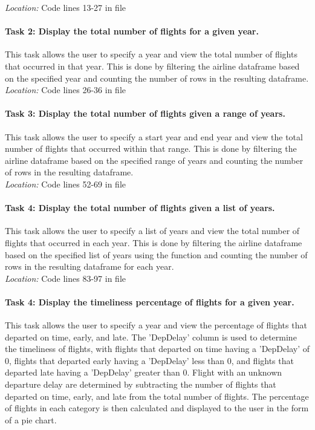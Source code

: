 \noindent \textit{Location:} Code lines 13-27 in file 

\paragraph{Task 2: Display the total number of flights for a given year.} This task allows the user to specify a year and view the total number of flights that occurred in that year. This is done by filtering the airline dataframe based on the specified year and counting the number of rows in the resulting dataframe.\\

\noindent \textit{Location:} Code lines 26-36 in file 

\paragraph{Task 3: Display the total number of flights given a range of years.} This task allows the user to specify a start year and end year and view the total number of flights that occurred within that range. This is done by filtering the airline dataframe based on the specified range of years and counting the number of rows in the resulting dataframe.\\

\noindent \textit{Location:} Code lines 52-69 in file 

\paragraph{Task 4: Display the total number of flights given a list of years.} This task allows the user to specify a list of years and view the total number of flights that occurred in each year. This is done by filtering the airline dataframe based on the specified list of years using the  function and counting the number of rows in the resulting dataframe for each year.\\

\noindent \textit{Location:} Code lines 83-97 in file 

\paragraph{Task 4: Display the timeliness percentage of flights for a given year.} This task allows the user to specify a year and view the percentage of flights that departed on time, early, and late. The 'DepDelay' column is used to determine the timeliness of flights, with flights that departed on time having a 'DepDelay' of 0, flights that departed early having a 'DepDelay' less than 0, and flights that departed late having a 'DepDelay' greater than 0. Flight with an unknown departure delay are determined by subtracting the number of flights that departed on time, early, and late from the total number of flights. The percentage of flights in each category is then calculated and displayed to the user in the form of a pie chart.\\

